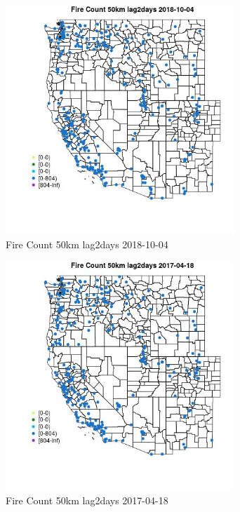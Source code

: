 \begin{figure} 
\centering  
\includegraphics[width=0.77\textwidth]{Code_Outputs/Report_ML_input_PM25_Step4_part_f_de_duplicated_aves_prioritize_24hr_obswNAs_MapObsFire_Count_50km_lag2days2018-10-04.jpg} 
\caption{\label{fig:Report_ML_input_PM25_Step4_part_f_de_duplicated_aves_prioritize_24hr_obswNAsMapObsFire_Count_50km_lag2days2018-10-04}Fire Count 50km lag2days 2018-10-04} 
\end{figure} 
 

\begin{figure} 
\centering  
\includegraphics[width=0.77\textwidth]{Code_Outputs/Report_ML_input_PM25_Step4_part_f_de_duplicated_aves_prioritize_24hr_obswNAs_MapObsFire_Count_50km_lag2days2017-04-18.jpg} 
\caption{\label{fig:Report_ML_input_PM25_Step4_part_f_de_duplicated_aves_prioritize_24hr_obswNAsMapObsFire_Count_50km_lag2days2017-04-18}Fire Count 50km lag2days 2017-04-18} 
\end{figure} 
 

